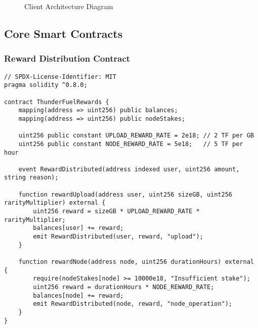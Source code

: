 \documentclass[12pt,a4paper]{article}
\begin{document}
\begin{figure}[htbp]
\centering
{}
\caption{Client Architecture Diagram}
\end{figure}

\subsection{Core Smart Contracts}

\subsubsection{Reward Distribution Contract}

\begin{lstlisting}[language=Solidity, frame=single, basicstyle=\footnotesize]
// SPDX-License-Identifier: MIT
pragma solidity ^0.8.0;

contract ThunderFuelRewards {
    mapping(address => uint256) public balances;
    mapping(address => uint256) public nodeStakes;
    
    uint256 public constant UPLOAD_REWARD_RATE = 2e18; // 2 TF per GB
    uint256 public constant NODE_REWARD_RATE = 5e18;   // 5 TF per hour
    
    event RewardDistributed(address indexed user, uint256 amount, string reason);
    
    function rewardUpload(address user, uint256 sizeGB, uint256 rarityMultiplier) external {
        uint256 reward = sizeGB * UPLOAD_REWARD_RATE * rarityMultiplier;
        balances[user] += reward;
        emit RewardDistributed(user, reward, "upload");
    }
    
    function rewardNode(address node, uint256 durationHours) external {
        require(nodeStakes[node] >= 10000e18, "Insufficient stake");
        uint256 reward = durationHours * NODE_REWARD_RATE;
        balances[node] += reward;
        emit RewardDistributed(node, reward, "node_operation");
    }
}
\end{lstlisting}
\end{document}
